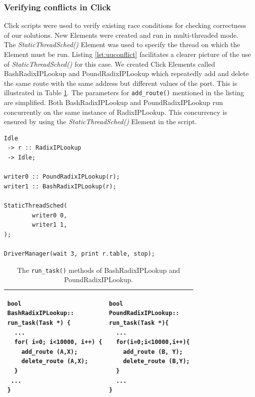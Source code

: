 \documentclass[a4paper]{article}
\begin{document}
\subsubsection{Verifying conflicts in Click}
\label{sec:uuconflicts}
 Click scripts were used to verify existing race conditions for checking correctness of our solutions. New Elements were created and run in multi-threaded mode. The \emph{StaticThreadSched()} Element was used to specify the thread on which the Element must be run. Listing \ref{lst:uuconflict} facilitates a clearer picture of the use of \emph{StaticThreadSched()} for this case. We created Click Elements called BashRadixIPLookup and PoundRadixIPLookup which repeatedly add and delete the same route with the same address but different values of the port. This is illustrated in Table \ref{tbl:uuverify}. The parameters for \texttt{add\_route()} mentioned in the listing are simplified. Both BashRadixIPLookup and PoundRadixIPLookup run concurrently on the same instance of RadixIPLookup. This concurrency is ensured by using the \emph{StaticThreadSched()} Element in the script.
\begin{lstlisting}[float=tph, caption=Click script for verifying updater-updater conflicts.,label=lst:uuconflict]
Idle
 -> r :: RadixIPLookup
 -> Idle;

writer0 :: PoundRadixIPLookup(r);
writer1 :: BashRadixIPLookup(r);

StaticThreadSched(
        writer0 0,
        writer1 1,
);

DriverManager(wait 3, print r.table, stop);

\end{lstlisting}
\begin{table}
\begin{center}
\begin{tabular}{|p{2.2in}|p{2.2in}|}
\hline
\begin{lstlisting}[label=lst:uubashradixiplookup]
bool
BashRadixIPLookup::
run_task(Task *) {
  ...
  for( i=0; i<10000, i++) {
    add_route (A,X);
    delete_route (A,X);
  }
 ...
}
\end{lstlisting}
&
\begin{lstlisting}[label=lst:uupoundradixiplookup]
bool
PoundRadixIPLookup::
run_task(Task *){
  ...
  for(i=0;i<10000,i++){
    add_route (B, Y);
    delete_route (B,Y);
  }
  ...
}
\end{lstlisting}\\
\hline
\end{tabular}
\end{center}
\caption{The \texttt{run\_task()} methods of BashRadixIPLookup and PoundRadixIPLookup.}
\label{tbl:uuverify}
\end{table}
\end{document}
